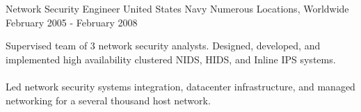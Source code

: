 \begin{cventries}
  \cventry
    {Network Security Engineer} %
    {United States Navy} %
    {Numerous Locations, Worldwide} %
    {February 2005 - February 2008} %
    {
      \begin{cvitems} %
        {Supervised team of 3 network security analysts. Designed, developed, and implemented high availability clustered NIDS, HIDS, and Inline IPS systems. \\~\\ Led network security systems integration, datacenter infrastructure, and managed networking for a several thousand host network.}
      \end{cvitems}
    }    
\end{cventries}
